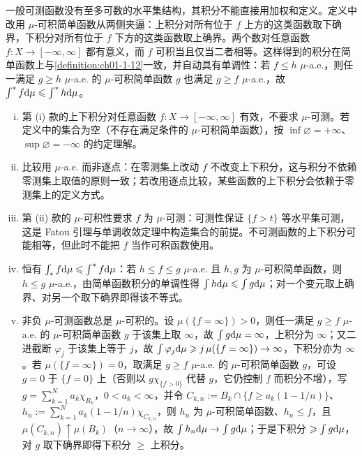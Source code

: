 \documentclass[../../main.tex]{subfiles}%
\begin{document}
\begin{remark}\label{remark:ch01-def-1-13-动机}
一般可测函数没有至多可数的水平集结构，其积分不能直接用加权和定义。定义中改用 $\mu$-可积简单函数从两侧夹逼：上积分对所有位于 $f$ 上方的这类函数取下确界，下积分对所有位于 $f$ 下方的这类函数取上确界。两个数对任意函数 $f:X\to[-\infty,\infty]$ 都有意义，而 $f$ 可积当且仅当二者相等。这样得到的积分在简单函数上与\cref{definition:ch01-1-12}一致，并自动具有单调性：若 $f\leqslant h$ $\mu$-a.e.，则任一满足 $g\geqslant h$ $\mu$-a.e. 的 $\mu$-可积简单函数 $g$ 也满足 $g\geqslant f$ $\mu$-a.e.，故 $\int^{*}f\mathrm{d}\mu\leqslant\int^{*}h\mathrm{d}\mu$。%
\end{remark}

\begin{remark}\label{remark:ch01-def-1-13-条件}
\begin{enumerate}[(i)]
\item 第 (i) 款的上下积分对任意函数 $f:X\to[-\infty,\infty]$ 有效，不要求 $\mu$-可测。若定义中的集合为空（不存在满足条件的 $\mu$-可积简单函数），按 $\inf\varnothing=+\infty$、$\sup\varnothing=-\infty$ 的约定理解。
\item 比较用 $\mu$-a.e. 而非逐点：在零测集上改动 $f$ 不改变上下积分，这与积分不依赖零测集上取值的原则一致；若改用逐点比较，某些函数的上下积分会依赖于零测集上的定义方式。
\item 第 (ii) 款的 $\mu$-可积性要求 $f$ 为 $\mu$-可测：可测性保证 $\{f>t\}$ 等水平集可测，这是 Fatou 引理与单调收敛定理中构造集合的前提。不可测函数的上下积分可能相等，但此时不能把 $f$ 当作可积函数使用。
\item 恒有 $\int_{*}f\mathrm{d}\mu\leqslant\int^{*}f\mathrm{d}\mu$：若 $h\leqslant f\leqslant g$ $\mu$-a.e. 且 $h,g$ 为 $\mu$-可积简单函数，则 $h\leqslant g$ $\mu$-a.e.，由简单函数积分的单调性得 $\int h\mathrm{d}\mu\leqslant\int g\mathrm{d}\mu$；对一个变元取上确界、对另一个取下确界即得该不等式。
\item 非负 $\mu$-可测函数总是 $\mu$-可积的。设 $\mu(\{f=\infty\})>0$，则任一满足 $g\geqslant f$ $\mu$-a.e. 的 $\mu$-可积简单函数 $g$ 于该集上取 $\infty$，故 $\int g\mathrm{d}\mu=\infty$，上积分为 $\infty$；又二进截断 $\varphi_j$ 于该集上等于 $j$，故 $\int\varphi_j\mathrm{d}\mu\geqslant j\,\mu(\{f=\infty\})\to\infty$，下积分亦为 $\infty$。若 $\mu(\{f=\infty\})=0$，取满足 $g\geqslant f$ $\mu$-a.e. 的 $\mu$-可积简单函数 $g$，可设 $g=0$ 于 $\{f=0\}$ 上（否则以 $g\chi_{\{f>0\}}$ 代替 $g$，它仍控制 $f$ 而积分不增），写 $g=\sum_{k=1}^{N}a_k\chi_{B_k}$，$0<a_k<\infty$，并令 $C_{k,n}:=B_k\cap\{f\geqslant a_k(1-1/n)\}$、$h_n:=\sum_{k=1}^{N}a_k(1-1/n)\chi_{C_{k,n}}$，则 $h_n$ 为 $\mu$-可积简单函数、$h_n\leqslant f$，且 $\mu(C_{k,n})\uparrow\mu(B_k)$（$n\to\infty$），故 $\int h_n\mathrm{d}\mu\to\int g\mathrm{d}\mu$；于是下积分 $\geqslant\int g\mathrm{d}\mu$，对 $g$ 取下确界即得下积分 $\geqslant$ 上积分。
\end{enumerate}
\end{remark}
\end{document}
